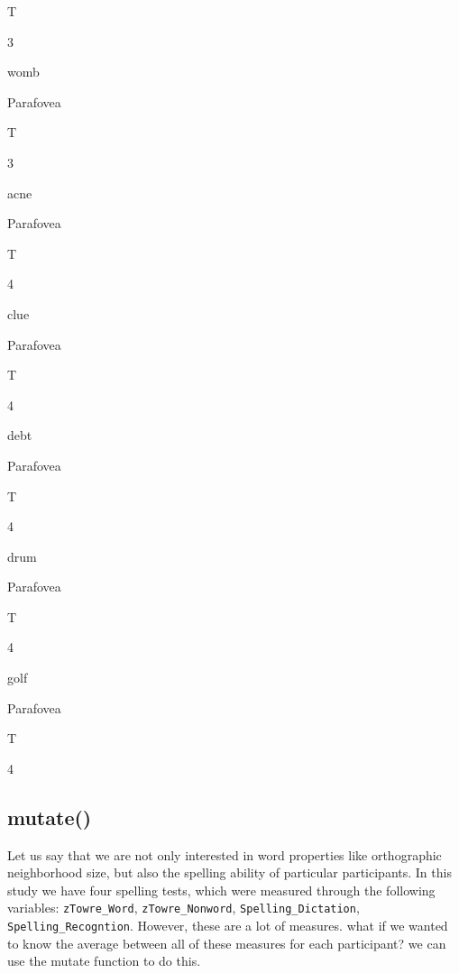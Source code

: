 \documentclass[]{book}
\begin{document}
T

3

womb

Parafovea

T

3

acne

Parafovea

T

4

clue

Parafovea

T

4

debt

Parafovea

T

4

drum

Parafovea

T

4

golf

Parafovea

T

4

\subsection{mutate()}\label{mutate}

Let us say that we are not only interested in word properties like
orthographic neighborhood size, but also the spelling ability of
particular participants. In this study we have four spelling tests,
which were measured through the following variables:
\texttt{zTowre\_Word}, \texttt{zTowre\_Nonword},
\texttt{Spelling\_Dictation}, \texttt{Spelling\_Recogntion}. However,
these are a lot of measures. what if we wanted to know the average
between all of these measures for each participant? we can use the
mutate function to do this.
\end{document}
